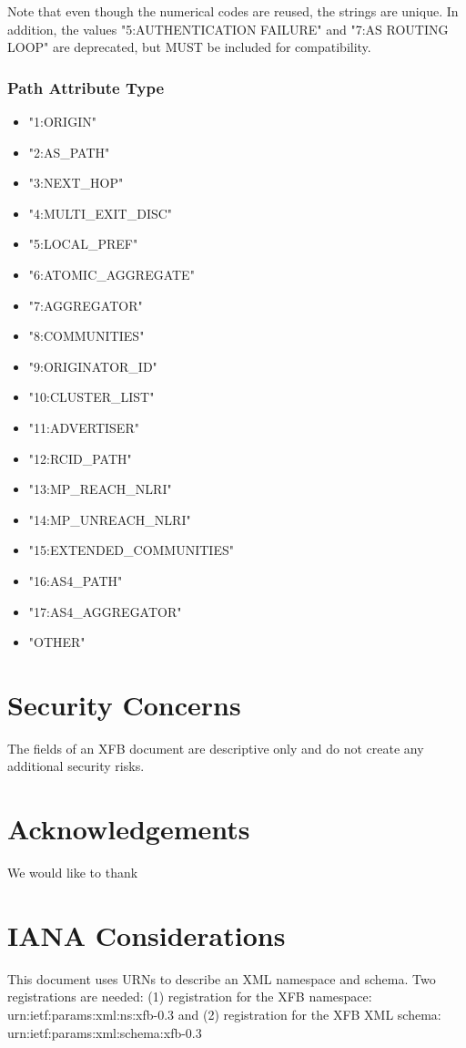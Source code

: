 \documentclass{article}
\begin{document}
Note that even though the numerical codes are reused, the strings are unique.  In addition, the values "5:AUTHENTICATION FAILURE" and "7:AS ROUTING LOOP" are deprecated, but MUST be included for compatibility.

\subsubsection{Path Attribute Type}
\begin{itemize}
\item{"1:ORIGIN"}
\item{"2:AS_PATH"}
\item{"3:NEXT_HOP"}
\item{"4:MULTI_EXIT_DISC"}
\item{"5:LOCAL_PREF"}
\item{"6:ATOMIC_AGGREGATE"}
\item{"7:AGGREGATOR"}
\item{"8:COMMUNITIES"}
\item{"9:ORIGINATOR_ID"}
\item{"10:CLUSTER_LIST"}
\item{"11:ADVERTISER"}
\item{"12:RCID_PATH"}
\item{"13:MP_REACH_NLRI"}
\item{"14:MP_UNREACH_NLRI"}
\item{"15:EXTENDED_COMMUNITIES"}
\item{"16:AS4_PATH"}
\item{"17:AS4_AGGREGATOR"}
\item{"OTHER"}
\end{itemize}

\section{Security Concerns}
The fields of an XFB document are descriptive only and do not create any additional security risks.

\section{Acknowledgements}
We would like to thank 

\section{IANA Considerations}

This document uses URNs to describe an XML namespace and schema.  Two
registrations are needed: (1) registration for the XFB namespace:
urn:ietf:params:xml:ns:xfb-0.3 and (2) registration for the XFB XML
schema: urn:ietf:params:xml:schema:xfb-0.3
\end{document}
